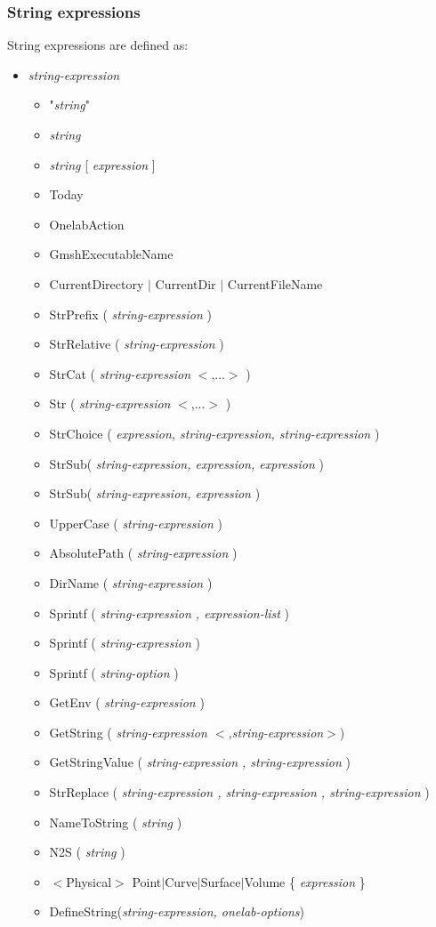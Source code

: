 \documentclass[dvipdfmx, 9pt, a4paper]{article}
\numberwithin{equation}{section}
\begin{document}
\subsubsection{String expressions}
String expressions are defined as:
\begin{itemize}
\item {\it string-expression}
\begin{itemize}
\item "{\it string}"
\item {\it string}
\item {\it string} [ {\it expression} ]
\item Today
\item OnelabAction
\item GmshExecutableName
\item CurrentDirectory $|$ CurrentDir $|$ CurrentFileName
\item StrPrefix ( {\it string-expression} )
\item StrRelative ( {\it string-expression} )
\item StrCat ( {\it string-expression} $<$,...$>$ )
\item Str ( {\it string-expression} $<$,...$>$ )
\item StrChoice ( {\it expression, string-expression, string-expression} )
\item StrSub( {\it string-expression, expression, expression} )
\item StrSub( {\it string-expression, expression} )
\item UpperCase ( {\it string-expression} )
\item AbsolutePath ( {\it string-expression} )
\item DirName ( {\it string-expression} )
\item Sprintf ( {\it string-expression , expression-list} )
\item Sprintf ( {\it string-expression} )
\item Sprintf ( {\it string-option} )
\item GetEnv ( {\it string-expression} )
\item GetString ( {\it string-expression $<$,string-expression$>$})
\item GetStringValue ( {\it string-expression , string-expression} )
\item StrReplace ( {\it string-expression , string-expression , string-expression} )
\item NameToString ( {\it string} )
\item N2S ( {\it string} )
\item $<$Physical$>$ Point$|$Curve$|$Surface$|$Volume \{ {\it expression }\}
\item DefineString({\it string-expression, onelab-options})
\end{itemize}
\end{itemize}
\end{document}
